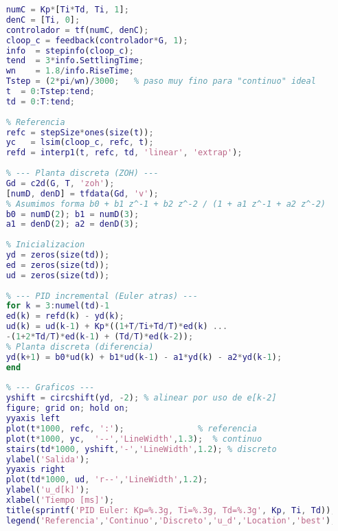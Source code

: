 \newpage
\begin{table}[!t]
	\centering
	\small
	\caption{Resultados obtenidos.}
	\label{tab:resultadosPID}
\end{table}

\begin{lstlisting}[language=Matlab,style=matlabstyle, caption={Simulacion PID incremental (Euler) vs continuo}, label={lst:pid_euler_ideal}]
	% --- Control continuo (referencia) ---
	numC = Kp*[Ti*Td, Ti, 1];
	denC = [Ti, 0];
	controlador = tf(numC, denC);
	cloop_c = feedback(controlador*G, 1);
	info  = stepinfo(cloop_c);
	tend  = 3*info.SettlingTime;
	wn    = 1.8/info.RiseTime;
	Tstep = (2*pi/wn)/3000;   % paso muy fino para "continuo" ideal
	t  = 0:Tstep:tend;
	td = 0:T:tend;
	
	% Referencia
	refc = stepSize*ones(size(t));
	yc   = lsim(cloop_c, refc, t);
	refd = interp1(t, refc, td, 'linear', 'extrap');
	
	% --- Planta discreta (ZOH) ---
	Gd = c2d(G, T, 'zoh');
	[numD, denD] = tfdata(Gd, 'v');
	% Asumimos forma b0 + b1 z^-1 + b2 z^-2 / (1 + a1 z^-1 + a2 z^-2)
	b0 = numD(2); b1 = numD(3);
	a1 = denD(2); a2 = denD(3);
	
	% Inicializacion
	yd = zeros(size(td));
	ed = zeros(size(td));
	ud = zeros(size(td));
	
	% --- PID incremental (Euler atras) ---
	for k = 3:numel(td)-1
	ed(k) = refd(k) - yd(k);
	ud(k) = ud(k-1) + Kp*((1+T/Ti+Td/T)*ed(k) ...
	-(1+2*Td/T)*ed(k-1) + (Td/T)*ed(k-2));
	% Planta discreta (diferencia)
	yd(k+1) = b0*ud(k) + b1*ud(k-1) - a1*yd(k) - a2*yd(k-1);
	end
	
	% --- Graficos ---
	yshift = circshift(yd, -2); % alinear por uso de e[k-2]
	figure; grid on; hold on;
	yyaxis left
	plot(t*1000, refc, ':');               % referencia
	plot(t*1000, yc,  '--','LineWidth',1.3);  % continuo
	stairs(td*1000, yshift,'-','LineWidth',1.2); % discreto
	ylabel('Salida');
	yyaxis right
	plot(td*1000, ud, 'r--','LineWidth',1.2);
	ylabel('u_d[k]');
	xlabel('Tiempo [ms]');
	title(sprintf('PID Euler: Kp=%.3g, Ti=%.3g, Td=%.3g', Kp, Ti, Td));
	legend('Referencia','Continuo','Discreto','u_d','Location','best');
\end{lstlisting}


